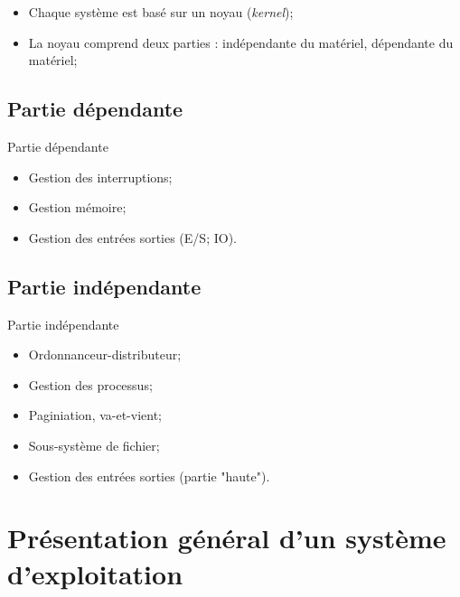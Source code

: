 \begin{frame}{\sectitle}
\begin{block}{\subsectitle}
\begin{itemize}
    \item Chaque système est basé sur un noyau (\textit{kernel});
    \item La noyau comprend deux parties : indépendante du matériel, dépendante
    du matériel;
\end{itemize}
\end{block}

\def\subsectitle{Partie dépendante}
\subsection{\subsectitle}
\begin{block}{\subsectitle}
\begin{itemize}
    \item Gestion des interruptions;
    \item Gestion mémoire;
    \item Gestion des entrées sorties (E/S; IO).
\end{itemize}

\end{block}
\end{frame}

\def\subsectitle{Partie indépendante}
\subsection{\subsectitle}

\begin{frame}{\sectitle}
\begin{block}{\subsectitle}
\begin{itemize}
    \item Ordonnanceur-distributeur;
    \item Gestion des processus;
    \item Paginiation, va-et-vient;
    \item Sous-système de fichier;
    \item Gestion des entrées sorties (partie "haute").
\end{itemize}
\end{block}


\end{frame}

\def\sectitle{Présentation général d'un système d'exploitation}
\section{\sectitle}
\def\subsectitle{Modèle en couche}
